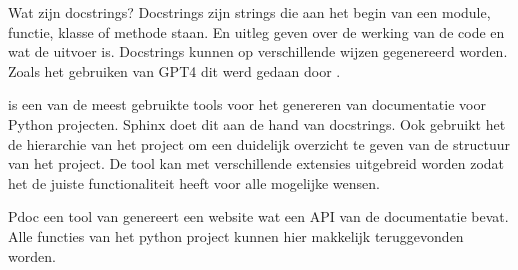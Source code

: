 Wat zijn docstrings? Docstrings zijn strings die aan het begin van een module, functie, klasse of methode staan. 
En uitleg geven over de werking van de code en wat de uitvoer is.
Docstrings kunnen op verschillende wijzen gegenereerd worden. Zoals het gebruiken van GPT4 \textcite{OpenAI2023} dit werd gedaan door \textcite{Trofficus2023}.

\textcite{Sphinx2023} is een van de meest gebruikte tools voor het genereren van documentatie voor Python projecten.
Sphinx doet dit aan de hand van docstrings. Ook gebruikt het de hierarchie van het project om een duidelijk overzicht te geven van de structuur van het project.
De tool kan met verschillende extensies uitgebreid worden zodat het de juiste functionaliteit heeft voor alle mogelijke wensen.

Pdoc een tool van \textcite{GallantHils2023} genereert een website wat een API van de documentatie bevat. 
Alle functies van het python project kunnen hier makkelijk teruggevonden worden.